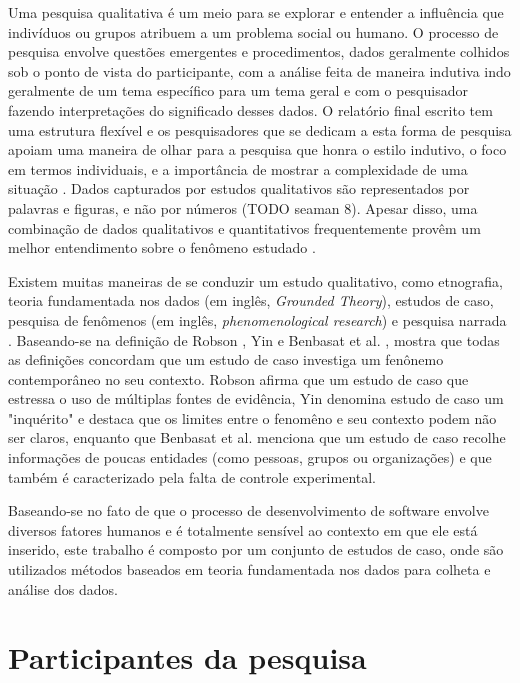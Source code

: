 Uma pesquisa qualitativa é um meio para se explorar e entender a influência que indivíduos ou grupos atribuem a um
problema social ou humano. O processo de pesquisa envolve questões emergentes e procedimentos, dados geralmente colhidos
sob o ponto de vista do participante, com a análise feita de maneira indutiva indo geralmente de um tema específico 
para um tema geral e com o pesquisador fazendo interpretações do significado desses dados. 
O relatório final escrito tem uma estrutura flexível e os pesquisadores que se dedicam a esta forma de pesquisa 
apoiam uma maneira de olhar para a pesquisa que honra o estilo indutivo, o foco em termos individuais, 
e a importância de mostrar a complexidade de uma situação \cite{creswell}. Dados capturados por estudos qualitativos
são representados por palavras e figuras, e não por números (TODO seaman 8). Apesar disso, uma combinação de dados
qualitativos e quantitativos frequentemente provêm um melhor entendimento sobre o fenômeno estudado \cite{seaman}.  

Existem muitas maneiras de se conduzir
um estudo qualitativo, como etnografia, teoria fundamentada nos dados (em inglês, \textit{Grounded Theory}), estudos de caso,
pesquisa de fenômenos (em inglês, \textit{phenomenological research}) e pesquisa narrada \cite{creswell}. 
Baseando-se na definição de Robson \cite{robson}, Yin \cite{yin} e Benbasat et al. \cite{benbasat}, \cite{guidelines-case-study} 
mostra que todas as definições concordam que um estudo de caso investiga um fenônemo contemporâneo no seu contexto. Robson afirma
que um estudo de caso que estressa o uso de múltiplas fontes de evidência, Yin denomina estudo de caso um "inquérito" e
destaca que os limites entre o fenomêno e seu contexto podem não ser claros, enquanto que Benbasat et al. menciona que um estudo
de caso recolhe informações de poucas entidades (como pessoas, grupos ou organizações) e que também é caracterizado pela
falta de controle experimental.

Baseando-se no fato de que o processo de desenvolvimento de software envolve diversos fatores humanos e é totalmente sensível
ao contexto em que ele está inserido, este trabalho é composto por um conjunto de estudos de caso, 
onde são utilizados métodos baseados em teoria fundamentada nos dados para colheta
e análise dos dados. 

\section{Participantes da pesquisa}
\label{sec:planejamento-participantes}

